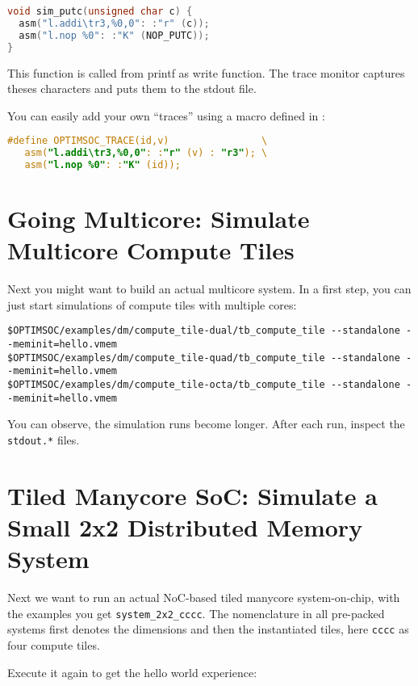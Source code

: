 \begin{lstlisting}[language=C]
void sim_putc(unsigned char c) {
  asm("l.addi\tr3,%0,0": :"r" (c));
  asm("l.nop %0": :"K" (NOP_PUTC));
}
\end{lstlisting}

This function is called from printf as write function. The trace
monitor captures theses characters and puts them to the stdout file.

You can easily add your own ``traces'' using a macro defined in
:

\begin{lstlisting}[language=C]
#define OPTIMSOC_TRACE(id,v)                \
   asm("l.addi\tr3,%0,0": :"r" (v) : "r3"); \
   asm("l.nop %0": :"K" (id));
\end{lstlisting}

\section{Going Multicore: Simulate Multicore Compute Tiles}

Next you might want to build an actual multicore system. In a first
step, you can just start simulations of compute tiles with multiple
cores:

\begin{lstlisting}
$OPTIMSOC/examples/dm/compute_tile-dual/tb_compute_tile --standalone --meminit=hello.vmem
$OPTIMSOC/examples/dm/compute_tile-quad/tb_compute_tile --standalone --meminit=hello.vmem
$OPTIMSOC/examples/dm/compute_tile-octa/tb_compute_tile --standalone --meminit=hello.vmem
\end{lstlisting}

You can observe, the simulation runs become longer. After each run,
inspect the \verb|stdout.*| files.

\section{Tiled Manycore SoC: Simulate a Small 2x2 Distributed Memory
  System}

Next we want to run an actual NoC-based tiled manycore system-on-chip,
with the examples you get \verb|system_2x2_cccc|. The nomenclature in
all pre-packed systems first denotes the dimensions and then the
instantiated tiles, here \verb|cccc| as four compute tiles.

Execute it again to get the hello world experience:

